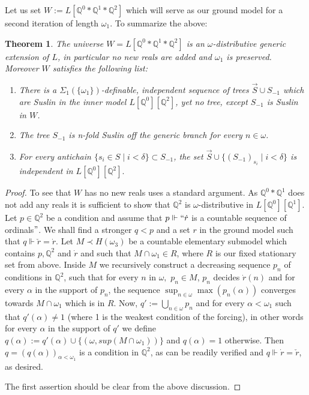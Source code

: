 \documentclass[a4paper,11pt]{article}
\newtheorem{theorem}{Theorem}[section]
\newcommand{\forceQ}{\mathbb{Q}}
\begin{document}
Let us set $W:= L[\forceQ^0\ast \forceQ^1  \ast \forceQ^2 ]$ which will serve as our ground model for a second iteration of length $\omega_1$. To summarize the above:

\begin{theorem}\label{MainPropertiesOfW}
The universe $W= L[\forceQ^0 \ast \forceQ^1 \ast \forceQ^2]$ is an $\omega$-distributive generic extension of $L$, in particular no new reals are added and $\omega_1$ is preserved. Moreover $W$ satisfies the following list:
\begin{enumerate}
\item There  is a $\Sigma_1(\{\omega_1\})$-definable, independent sequence of  trees $\vec{S} \cup S_{-1}$ which are Suslin in the inner model $L[\forceQ^0][\forceQ^2]$, yet no tree, except $S_{-1}$ is Suslin in $W$.
\item The tree $S_{-1}$ is n-fold Suslin off the generic branch for every $n \in \omega$.
\item  For every antichain  $\{ s_i \in S \mid i < \delta \} \subset S_{-1}$, the set 
$\vec{S} \cup \{ (S_{-1} )_{s_i} \mid i < \delta \}$ is independent in $L[\forceQ^0][\forceQ^2].$
\end{enumerate}


\end{theorem}
\begin{proof}
To see that $W$ has no new reals uses a standard argument. As $\forceQ^0 \ast \forceQ^1$ does not add any reals it is sufficient to show that $\forceQ^2$ is $\omega$-distributive in $L[\forceQ^0][\forceQ^1]$.
Let $p \in \forceQ^2$ be a condition and assume that $p \Vdash ``\dot{r} $ is a countable sequence of ordinals$"$. We shall find a stronger $q < p$ and a set $r$ in the ground model such that $q \Vdash \check{r}=\dot{r}$. Let $M \prec H(\omega_3)$ be a countable elementary submodel which contains $p, \forceQ^2$ and $\dot{r}$ and such that $M \cap \omega_1 \in R$, where $R$ is our fixed stationary set from above. Inside $M$ we recursively construct a decreasing sequence $p_n$ of conditions in $\forceQ^2$, such that for every $n$ in $\omega,$ $p_n \in M$, $p_n$ decides $\dot{r}(n)$ and for every $\alpha$ in the support of $p_n$, the sequence $\operatorname{sup}_{n \in \omega} \operatorname{max}( p_n(\alpha))$ converges towards $M \cap \omega_1$ which is in $R$. Now, $q':= \bigcup_{n \in \omega} p_n$ and for every $\alpha< \omega_1$ such that $q'(\alpha)\ne 1$ (where 1 is the weakest condition of the forcing),  in other words for every $\alpha$ in the support of $q'$ we define $q(\alpha):= q'(\alpha) \cup \{(\omega,sup (M \cap \omega_1))\}$ and $q(\alpha)=1$ otherwise. Then $q=(q(\alpha))_{\alpha < \omega_1}$ is a condition in $\forceQ^2$, as can be readily verified and $q \Vdash \dot{r} = \check{r}$, as desired.

The first assertion should be clear from the above discussion. 
\end{proof}
\end{document}
